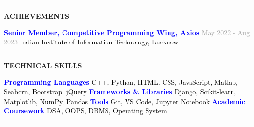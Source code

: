 \documentclass[letterpaper, 10pt, oneside]{article}
\begin{document}
\vspace{0.2cm}
\noindent
\textcolor{darkgray}{\rule{\textwidth}{0.4pt}}

\vspace{0.5cm}
\noindent
{\Large\bfseries ACHIEVEMENTS}

\vspace{0.2cm}
\noindent
\textcolor{blue}{\textbf{Senior Member, Competitive Programming Wing, Axios}} \hspace{1.8cm} \textcolor{darkgray}{May 2022 - Aug 2023}
\textcolor{black}{Indian Institute of Information Technology, Lucknow}

\vspace{0.2cm}
\noindent
\textcolor{darkgray}{\rule{\textwidth}{0.4pt}}

\vspace{0.5cm}
\noindent
{\Large\bfseries TECHNICAL SKILLS}

\vspace{0.2cm}
\noindent
\textcolor{blue}{\textbf{Programming Languages}} \hspace{4.8cm} \textcolor{black}{C++, Python, HTML, CSS, JavaScript, Matlab, Seaborn, Bootstrap, jQuery}
\textcolor{blue}{\textbf{Frameworks \& Libraries}} \hspace{4.2cm} \textcolor{black}{Django, Scikit-learn, Matplotlib, NumPy, Pandas}
\textcolor{blue}{\textbf{Tools}} \hspace{9.1cm} \textcolor{black}{Git, VS Code, Jupyter Notebook}
\textcolor{blue}{\textbf{Academic Coursework}} \hspace{4.5cm} \textcolor{black}{DSA, OOPS, DBMS, Operating System}

\vspace{0.2cm}
\noindent
\textcolor{darkgray}{\rule{\textwidth}{0.4pt}}
\end{document}
